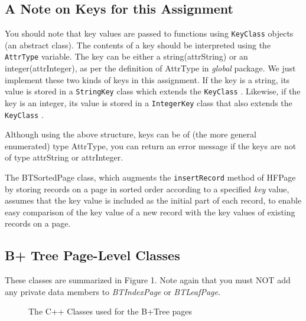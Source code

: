 \subsection{A Note on Keys for this Assignment}

You should note that key values are passed to functions using \verb+KeyClass+
objects (an abstract class).  
The  contents of a key should be interpreted using the
\verb+AttrType+ variable.  
The key can be either a string(attrString) or an integer(attrInteger), 
as per the definition of AttrType in {\em global} package.  We just 
implement these two kinds of keys in this assignment. 
If the key is a string, its value is stored in a \verb+StringKey+ class
which extends the \verb+KeyClass+ .  Likewise, if the key is an integer,
its value is stored in a \verb+IntegerKey+ class that also extends
the \verb+KeyClass+ . 

Although using the above structure, keys can be of (the more general 
enumerated) type AttrType, you can return an error message if the
keys are not of type attrString or attrInteger.  

The BTSortedPage class, which augments the
\verb+insertRecord+  method  of HFPage by storing 
records on a page in sorted order according to a specified {\em key} value,
assumes that the key value is included as the initial part of each
record, to enable easy comparison of the key value of a new
record with the key values of existing records on a page.

\subsection{B+ Tree Page-Level Classes}

These classes are summarized in Figure 1. 
Note again that you must NOT add any private data members  to  {\em 
BTIndexPage}  or  {\em  BTLeafPage}.  

\begin{figure}
\centerline{}
\caption{The C++ Classes used for the B+Tree pages}\label{f1:btpages}
\end{figure}

